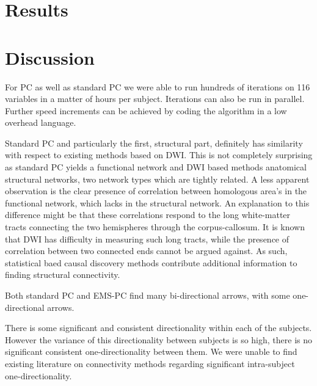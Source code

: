 \documentclass[a4paper, 10pt, english, onecolumn]{article}
\begin{document}
\section{Results}\label{sec:results}

\section{Discussion}



For PC as well as standard PC we were able to run hundreds of iterations on 116 variables in a matter of hours per subject.
Iterations can also be run in parallel.
Further speed increments can be achieved by coding the algorithm in a low overhead language.

Standard PC and particularly the first, structural part, definitely has similarity with respect to existing methods based on DWI.
This is not completely surprising as standard PC yields a functional network and DWI based methods anatomical structural networks, two network types which are tightly related.
A less apparent observation is the clear presence of correlation between homologous area's in the functional network, which lacks in the structural network.
An explanation to this difference might be that these correlations respond to the long white-matter tracts connecting the two hemispheres through the corpus-callosum.
It is known that DWI has difficulty in measuring such long tracts, while the presence of correlation between two connected ends cannot be argued against.
As such, statistical baed causal discovery methods contribute additional information to finding structural connectivity.

Both standard PC and EMS-PC find many bi-directional arrows, with some one-directional arrows.

There is some significant and consistent directionality within each of the subjects.
However the variance of this directionality between subjects is so high, there is no significant consistent one-directionality between them.
We were unable to find existing literature on connectivity methods regarding significant intra-subject one-directionality.
\end{document}
